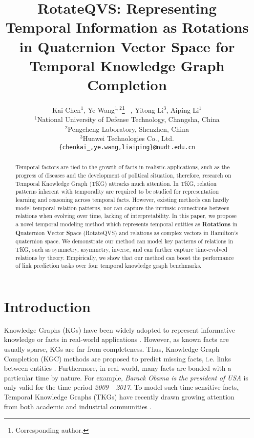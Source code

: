 \documentclass[11pt]{article}
\title{RotateQVS: Representing Temporal Information as Rotations in Quaternion Vector Space for Temporal Knowledge Graph Completion}
\author{
Kai Chen$^1$,
Ye Wang$^{1,2}$\thanks{\quad Corresponding author.} \ ,
Yitong Li$^3$,
Aiping Li$^1$
\\
$^1$National University of Defense Technology, Changsha, China\\
$^2$Pengcheng Laboratory, Shenzhen, China\\
$^3$Huawei Technologies Co., Ltd.\\
{\small \texttt{\{chenkai\_,ye.wang,liaiping\}@nudt.edu.cn} } \quad {\small \texttt{liyitong3@huawei.com}}
}
\newcommand{\exam}[1]{\emph{#1}\xspace}
\begin{document}
\maketitle
\begin{abstract}
Temporal factors are tied to the growth of facts in realistic applications, such as the progress of diseases and the development of political situation, therefore, research on Temporal Knowledge Graph (TKG) attracks much attention.
In TKG, relation patterns inherent with temporality are required to be studied for representation learning and reasoning across temporal facts.
However, existing methods can hardly model temporal relation patterns, nor can capture the intrinsic connections between relations when evolving over time, lacking of interpretability.
In this paper, we propose a novel temporal modeling method which represents temporal entities as \textbf{Rotations} in \textbf{Q}uaternion \textbf{V}ector \textbf{S}pace (RotateQVS) and relations as complex vectors in Hamilton’s quaternion space.
We demonstrate our method can model key patterns of relations in TKG, such as symmetry, asymmetry, inverse, and can further capture time-evolved relations by theory.
Empirically, we show that our method can boost the performance of link prediction tasks over four temporal knowledge graph benchmarks.
\end{abstract}


\section{Introduction}

Knowledge Graphs (KGs) have been widely adopted to represent informative knowledge or facts in real-world applications \cite{Bollacker2008FreebaseAC,miller1995wordnet,suchanek2007yago}.
However, as known facts are usually sparse, KGs are far from completeness. Thus, Knowledge Graph Completion (KGC) methods are proposed to predict missing facts, i.e. links between entities \cite{bordes2013translating,Yang2015EmbeddingEA,Dettmers2018Convolutional,CIM}.
Furthermore, in real world, many facts are bonded with a particular time by nature.
For example, \exam{Barack Obama is the president of USA} is only valid for the time period \exam{2009 - 2017}.
To model such time-sensitive facts, Temporal Knowledge Graphs (TKGs) have recently drawn growing attention from both academic and industrial communities \cite{lautenschlager2015icews,leetaru2013gdelt}.
\end{document}
